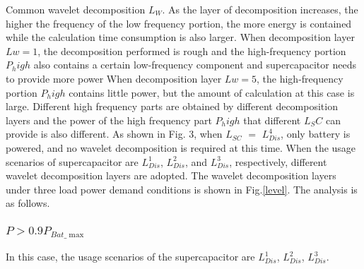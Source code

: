 \documentclass[energies,article,submit,moreauthors,pdftex,10pt,a4paper]{Definitions/mdpi}
\begin{document}
Common wavelet decomposition $L_W$.
As the layer of decomposition increases, the higher the frequency of the low frequency portion, the more energy is contained while the calculation time consumption is also larger.
When decomposition layer $Lw=1$, the decomposition performed is rough and the high-frequency portion $P_high$ also contains a certain low-frequency component and supercapacitor needs to provide more power
When decomposition layer $Lw=5$, the high-frequency portion $P_high$ contains little power, but the amount of calculation at this case is large.
Different high frequency parts are obtained by different decomposition layers and the power of the high frequency part $P_high$ that different $L_SC$ can provide is also different.
As shown in Fig. 3, when  $L_{SC}$ $=$ $ L_{Dis}^4$, only battery is powered, and no wavelet decomposition is required at this time. 
When the usage scenarios of supercapacitor are $ L_{Dis}^1$, $ L_{Dis}^2$, and $ L_{Dis}^3$, respectively, different wavelet decomposition layers are adopted.
The wavelet decomposition layers under three load power demand conditions is shown in Fig.\ref{level}. The analysis is as follows.
\subsubsection{${P>0.9P_{Bat\_\max }}$}
In this case, the usage scenarios of the supercapacitor are $ L_{Dis}^1$, $ L_{Dis}^2$, $ L_{Dis}^3$. 
\end{document}

